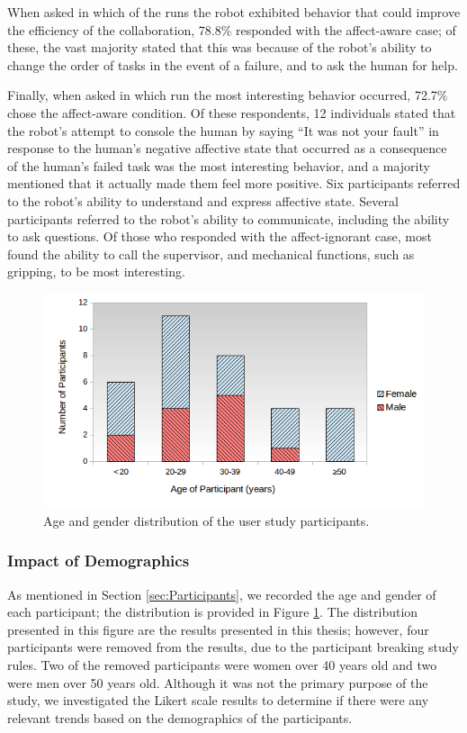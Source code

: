 \documentclass[12pt]{report}
\begin{document}
When asked in which of the runs the robot exhibited behavior that could improve
the efficiency of the collaboration, 78.8\% responded with the affect-aware
case; of these, the vast majority stated that this was because of the robot's
ability to change the order of tasks in the event of a failure, and to ask the
human for help.

Finally, when asked in which run the most interesting behavior occurred,
72.7\% chose the affect-aware condition. Of these respondents, 12
individuals stated that the robot's attempt to console the human by saying ``It
was not your fault'' in response to the human's negative affective state that occurred
as a consequence of the human's failed task was the most interesting behavior,
and a majority mentioned that it actually made them feel more positive. Six
participants referred to the robot's ability to understand and express affective state.
Several participants referred to the robot's ability to communicate, including
the ability to ask questions. Of those who responded with the affect-ignorant
case, most found the ability to call the supervisor, and mechanical functions,
such as gripping, to be most interesting.

\begin{figure}
\centering
\includegraphics[width=1\textwidth]{figure/age-gender-distribution.png}
\caption{Age and gender distribution of the user study participants.}
\label{fig:age-gender-distribution}
\end{figure}

\subsubsection{Impact of Demographics} 
As mentioned in Section \ref{sec:Participants}, we recorded the age and gender
of each participant; the distribution is provided in Figure
\ref{fig:age-gender-distribution}. The distribution presented in this figure are
the results presented in this thesis; however, four participants were removed
from the results, due to the participant breaking study rules. Two of the
removed participants were women over 40 years old and two were men over 50 years
old. Although it was not the primary purpose of the study, we investigated the
Likert scale results to determine if there were any relevant trends based on the
demographics of the participants.
\end{document}
